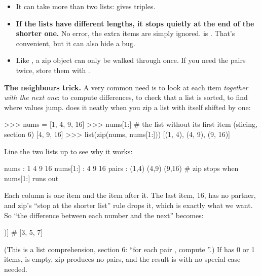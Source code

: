 \documentclass[10pt,a4paper]{article}
\begin{document}
\begin{itemize}
\item It can take more than two lists:  gives triples.
\item \textbf{If the lists have different lengths, it stops quietly at the end of the shorter one.} No error, the extra items are simply ignored.  is . That’s convenient, but it can also hide a bug.
\item Like , a zip object can only be walked through once. If you need the pairs twice, store them with .
\end{itemize}
\textbf{The neighbours trick.} A very common need is to look at each item \emph{together with the next one}: to compute differences, to check that a list is sorted, to find where values jump.  does it neatly when you zip a list with itself shifted by one:
\begin{txtcode}
>>> nums = [1, 4, 9, 16]
>>> nums[1:]                       # the list without its first item (slicing, section 6)
[4, 9, 16]
>>> list(zip(nums, nums[1:]))
[(1, 4), (4, 9), (9, 16)]
\end{txtcode}
Line the two lists up to see why it works:
\begin{txtcode}
nums      :  1   4   9   16
nums[1:]  :  4   9   16
pairs     : (1,4) (4,9) (9,16)     # zip stops when nums[1:] runs out
\end{txtcode}
Each column is one item and the item after it. The last item, 16, has no partner, and zip’s “stop at the shorter list” rule drops it, which is exactly what we want. So “the difference between each number and the next” becomes:
\begin{pycode}
[b - a for a, b in zip(nums, nums[1:])]      # [3, 5, 7]
\end{pycode}
(This is a list comprehension, section 6: “for each pair , compute ”.) If  has 0 or 1 items,  is empty, zip produces no pairs, and the result is \code{[]} with no special case needed.
\end{document}
